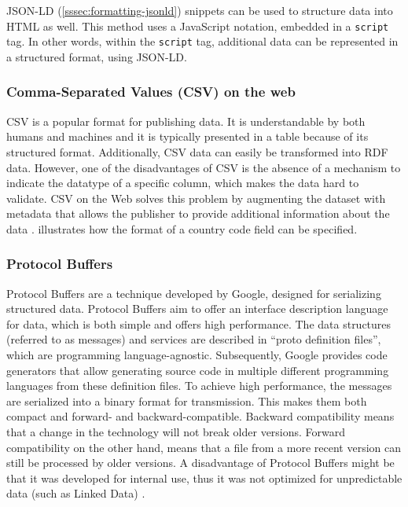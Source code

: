 

\noindent JSON-LD (\cref{sssec:formatting-jsonld}) snippets can be used to structure data into HTML as well. This method uses a JavaScript notation, embedded in a \texttt{script} tag. In other words, within the \texttt{script} tag, additional data can be represented in a structured format, using JSON-LD.

\subsubsection{Comma-Separated Values (CSV) on the web}
CSV is a popular format for publishing data. It is understandable by both humans and machines and it is typically presented in a table because of its structured format. Additionally, CSV data can easily be transformed into RDF data. However, one of the disadvantages of CSV is the absence of a mechanism to indicate the datatype of a specific column, which makes the data hard to validate. CSV on the Web solves this problem by augmenting the dataset with metadata that allows the publisher to provide additional information about the data \cite{tennison2016csv}.  illustrates how the format of a country code field can be specified.



\subsubsection{Protocol Buffers}
Protocol Buffers are a technique developed by Google, designed for serializing structured data. Protocol Buffers aim to offer an interface description language for data, which is both simple and offers high performance. The data structures (referred to as messages) and services are described in ``proto definition files'', which are programming language-agnostic. Subsequently, Google provides code generators that allow generating source code in multiple different programming languages from these definition files. To achieve high performance, the messages are serialized into a binary format for transmission. This makes them both compact and forward- and backward-compatible. Backward compatibility means that a change in the technology will not break older versions. Forward compatibility on the other hand, means that a file from a more recent version can still be processed by older versions. A disadvantage of Protocol Buffers might be that it was developed for internal use, thus it was not optimized for unpredictable data (such as Linked Data) \cite{protobuf}.\\

